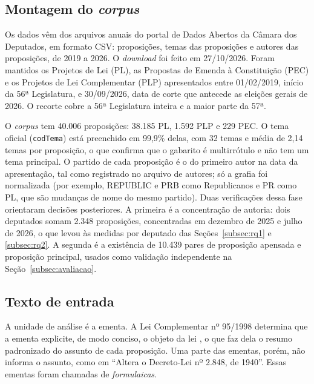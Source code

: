 \subsection{Montagem do \textit{corpus}}
\label{subsec:corpus}

Os dados vêm dos arquivos anuais do portal de Dados Abertos da Câmara dos Deputados, em formato CSV: proposições, temas das proposições e autores das proposições, de 2019 a 2026. O \textit{download} foi feito em 27/10/2026. Foram mantidos os Projetos de Lei (PL), as Propostas de Emenda à Constituição (PEC) e os Projetos de Lei Complementar (PLP) apresentados entre 01/02/2019, início da 56ª Legislatura, e 30/09/2026, data de corte que antecede as eleições gerais de 2026. O recorte cobre a 56ª Legislatura inteira e a maior parte da 57ª.

O \textit{corpus} tem 40.006 proposições: 38.185 PL, 1.592 PLP e 229 PEC. O tema oficial (\texttt{codTema}) está preenchido em 99,9\% delas, com 32 temas e média de 2,14 temas por proposição, o que confirma que o gabarito é multirrótulo e não tem um tema principal. O partido de cada proposição é o do primeiro autor na data da apresentação, tal como registrado no arquivo de autores; só a grafia foi normalizada (por exemplo, REPUBLIC e PRB como Republicanos e PR como PL, que são mudanças de nome do mesmo partido). Duas verificações dessa fase orientaram decisões posteriores. A primeira é a concentração de autoria: dois deputados somam 2.348 proposições, concentradas em dezembro de 2025 e julho de 2026, o que levou às medidas por deputado das Seções~\ref{subsec:rq1} e \ref{subsec:rq2}. A segunda é a existência de 10.439 pares de proposição apensada e proposição principal, usados como validação independente na Seção~\ref{subsec:avaliacao}.

\subsection{Texto de entrada}
\label{subsec:texto}

A unidade de análise é a ementa. A Lei Complementar nº 95/1998 determina que a ementa explicite, de modo conciso, o objeto da lei \citep{brasil1998lc95}, o que faz dela o resumo padronizado do assunto de cada proposição. Uma parte das ementas, porém, não informa o assunto, como em ``Altera o Decreto-Lei nº 2.848, de 1940''. Essas ementas foram chamadas de \textit{formulaicas}.

